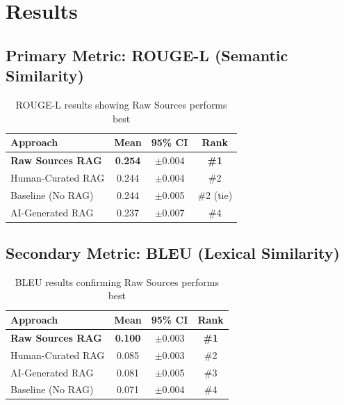 \documentclass[11pt]{article}
\begin{document}
\section{Results}

\subsection{Primary Metric: ROUGE-L (Semantic Similarity)}

\begin{table}[h]
\centering
\begin{tabular}{@{}lccc@{}}
\toprule
\textbf{Approach} & \textbf{Mean} & \textbf{95\% CI} & \textbf{Rank} \\
\midrule
\cellcolor{green!20}\textbf{Raw Sources RAG} & \cellcolor{green!20}\textbf{0.254} & \cellcolor{green!20}$\pm$0.004 & \cellcolor{green!20}\textbf{\#1} \\
Human-Curated RAG & 0.244 & $\pm$0.004 & \#2 \\
Baseline (No RAG) & 0.244 & $\pm$0.005 & \#2 (tie) \\
AI-Generated RAG & 0.237 & $\pm$0.007 & \#4 \\
\bottomrule
\end{tabular}
\caption{ROUGE-L results showing Raw Sources performs best}
\end{table}

\subsection{Secondary Metric: BLEU (Lexical Similarity)}

\begin{table}[h]
\centering
\begin{tabular}{@{}lccc@{}}
\toprule
\textbf{Approach} & \textbf{Mean} & \textbf{95\% CI} & \textbf{Rank} \\
\midrule
\cellcolor{green!20}\textbf{Raw Sources RAG} & \cellcolor{green!20}\textbf{0.100} & \cellcolor{green!20}$\pm$0.003 & \cellcolor{green!20}\textbf{\#1} \\
Human-Curated RAG & 0.085 & $\pm$0.003 & \#2 \\
AI-Generated RAG & 0.081 & $\pm$0.005 & \#3 \\
Baseline (No RAG) & 0.071 & $\pm$0.004 & \#4 \\
\bottomrule
\end{tabular}
\caption{BLEU results confirming Raw Sources performs best}
\end{table}
\end{document}
